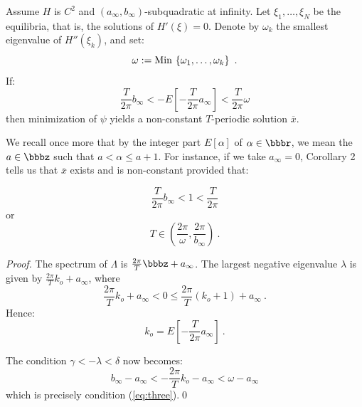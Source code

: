 %
\begin{corollary}
Assume $H$ is $C^{2}$ and
$\left(a_{\infty},b_{\infty}\right)$-subquadratic at infinity. Let
$\xi_{1},\allowbreak\dots,\allowbreak\xi_{N}$  be the
equilibria, that is, the solutions of $H' (\xi ) = 0$.
Denote by $\omega_{k}$
the smallest eigenvalue of $H'' \left(\xi_{k}\right)$, and set:
\begin{equation}
  \omega : = {\rm Min\,} \left\{\omega_{1},\dots,\omega_{k}\right\}\ .
\end{equation}
If:
\begin{equation}
  \frac{T}{2\pi} b_{\infty} <
  - E \left[- \frac{T}{2\pi}a_{\infty}\right] <
  \frac{T}{2\pi}\omega
  \label{eq:three}
\end{equation}
then minimization of $\psi$ yields a non-constant $T$-periodic solution
$\overline{x}$.
\end{corollary}
%

We recall once more that by the integer part $E [\alpha ]$ of
$\alpha \in \bbbr$, we mean the $a\in \bbbz$
such that $a< \alpha \le a+1$. For instance,
if we take $a_{\infty} = 0$, Corollary 2 tells
us that $\overline{x}$ exists and is
non-constant provided that:

\begin{equation}
  \frac{T}{2\pi} b_{\infty} < 1 < \frac{T}{2\pi}
\end{equation}
or
\begin{equation}
  T\in \left(\frac{2\pi}{\omega},\frac{2\pi}{b_{\infty}}\right)\ .
  \label{eq:four}
\end{equation}

%
\begin{proof}
The spectrum of $\Lambda$ is $\frac{2\pi}{T} \bbbz +a_{\infty}$. The
largest negative eigenvalue $\lambda$ is given by
$\frac{2\pi}{T}k_{o} +a_{\infty}$,
where
\begin{equation}
  \frac{2\pi}{T}k_{o} + a_{\infty} < 0
  \le \frac{2\pi}{T} (k_{o} +1) + a_{\infty}\ .
\end{equation}
Hence:
\begin{equation}
  k_{o} = E \left[- \frac{T}{2\pi} a_{\infty}\right] \ .
\end{equation}

The condition $\gamma < -\lambda < \delta$ now becomes:
\begin{equation}
  b_{\infty} - a_{\infty} <
  - \frac{2\pi}{T} k_{o} -a_{\infty} < \omega -a_{\infty}
\end{equation}
which is precisely condition (\ref{eq:three}).\qed
\end{proof}
%


